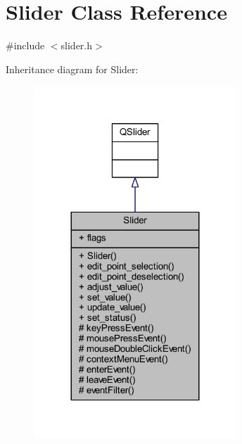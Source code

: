\hypertarget{a00024}{\section{Slider Class Reference}
\label{a00024}
}


{\ttfamily \#include $<$slider.\+h$>$}



Inheritance diagram for Slider\+:
\nopagebreak
\begin{figure}[H]
\begin{center}
\leavevmode
\includegraphics[width=216pt]{d0/da2/a00307}
\end{center}
\end{figure}


